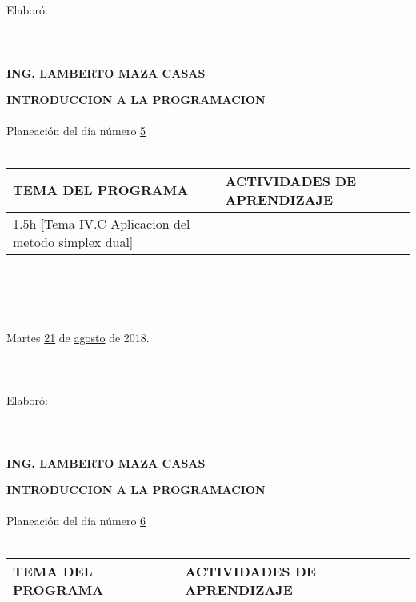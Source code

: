\documentclass[landscape]{article}
\begin{document}
{\begin{center}
\ \\
\ \\
Elabor\'o:
\ \\
\ \\
\ \\
\ \\
{\bf ING. LAMBERTO MAZA CASAS}
\end{center}
\eject
\begin{center}
{\bf 
INTRODUCCION A LA PROGRAMACION
}
\ \\
\ \\
Planeaci\'on del d\'ia n\'umero \underline{\hspace{0.5cm}5\hspace{0.5cm}}
\ \\
\ \\
\begin{tabular}{|p{11cm}|p{8cm}|}\hline
{\bf TEMA DEL PROGRAMA}&{\bf ACTIVIDADES DE APRENDIZAJE}\\\hline
	1.5h	[Tema IV.C Aplicacion del metodo simplex dual]
&\\
\hline
\end{tabular}
\ \\
\ \\
\ \\
\ \\
Martes \underline{\hspace{0.5cm}21\hspace{0.5cm}} de  \underline{\hspace{0.5cm}agosto\hspace{0.5cm}} de 2018.
\ \\
\ \\
\ \\
\ \\
Elabor\'o:
\ \\
\ \\
\ \\
\ \\
{\bf ING. LAMBERTO MAZA CASAS}
\end{center}
\eject
\begin{center}
{\bf 
INTRODUCCION A LA PROGRAMACION
}
\ \\
\ \\
Planeaci\'on del d\'ia n\'umero \underline{\hspace{0.5cm}6\hspace{0.5cm}}
\ \\
\ \\
\begin{tabular}{|p{11cm}|p{8cm}|}\hline
{\bf TEMA DEL PROGRAMA}&{\bf ACTIVIDADES DE APRENDIZAJE}\\\hline

\end{tabular}
\end{center}}
\end{document}
